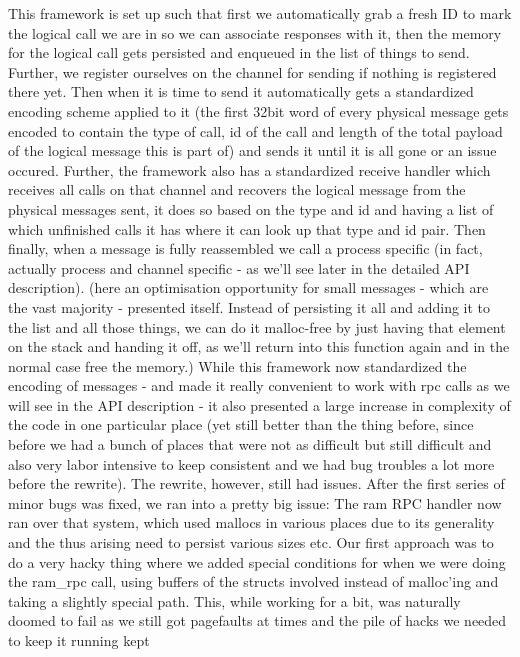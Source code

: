 This framework is set up such that first we automatically grab a fresh ID to 
mark the logical call we are in so we can associate responses with it, then 
the memory for the logical call gets persisted and enqueued in the list of 
things to send. Further, we register ourselves on the channel for sending if 
nothing is registered there yet.  
Then when it is time to send it automatically gets a standardized encoding 
scheme applied to it (the first 32bit word of every physical message gets 
encoded to contain the type of call, id of the call and length of the total 
payload of the logical message this is part of) and sends it until it is all 
gone or an issue occured.
Further, the framework also has a standardized receive handler which receives 
all calls on that channel and recovers the logical message from the physical 
messages sent, it does so based on the type and id and having a list of which 
unfinished calls it has where it can look up that type and id pair. Then 
finally, when a message is fully reassembled we call a process specific (in 
fact, actually process and channel specific - as we'll see later in the 
detailed API description). (here an optimisation opportunity for small 
messages - which are the vast majority - presented itself. Instead of 
persisting it all and adding it to the list and all those things, we can do it 
malloc-free by just having that element on the stack and handing it off, as 
we'll return into this function again and in the normal case free the memory.)
While this framework now standardized the encoding of messages - and made it 
really convenient to work with rpc calls as we will see in the API description 
- it also presented a large increase in complexity of the code in one 
particular place (yet still better than the thing before, since before we had 
a bunch of places that were not as difficult but still difficult and also very 
labor intensive to keep consistent and we had bug troubles a lot more before 
the rewrite).
The rewrite, however, still had issues. After the first series of minor bugs 
was fixed, we ran into a pretty big issue: The ram RPC handler now ran over 
that system, which used mallocs in various places due to its generality and 
the thus arising need to persist various sizes etc.
Our first approach was to do a very hacky thing where we added special 
conditions for when we were doing the ram\_rpc call, using buffers of the 
structs involved instead of malloc'ing and taking a slightly special path. 
This, while working for a bit, was naturally doomed to fail as we still got 
pagefaults at times and the pile of hacks we needed to keep it running kept 
